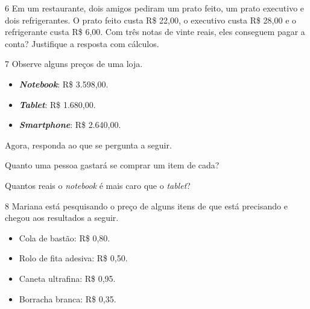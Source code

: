 \begin{mdframed}[linewidth=2pt,linecolor=salmao,roundcorner=2pt]
\num{6} Em um restaurante, dois amigos pediram um prato feito, um prato executivo
e dois refrigerantes. O prato feito custa R\$ 22,00, o executivo custa R\$
28,00 e o refrigerante custa R\$ 6,00. Com três notas de vinte reais, eles
conseguem pagar a conta? Justifique a resposta com cálculos.

\begin{mdframed}[linewidth=2pt,linecolor=salmao,roundcorner=2pt]

\end{mdframed}

\num{7} Observe alguns preços de uma loja.

\begin{mdframed}[linewidth=2pt,linecolor=azul!20,backgroundcolor=azul!20,roundcorner=2pt]
\begin{itemize}
  \item \textbf{\textit{Notebook}}: R\$ 3.598,00.
  \item \textbf{\textit{Tablet}}: R\$ 1.680,00.
  \item \textbf{\textit{Smartphone}}: R\$ 2.640,00.
\end{itemize}
\end{mdframed}

Agora, responda ao que se pergunta a seguir.

\begin{escolha}
\item
  Quanto uma pessoa gastará se comprar um item de cada?


\item
  Quantos reais o \textit{notebook} é mais caro que o \textit{tablet}?

\end{escolha}


\num{8} Mariana está pesquisando o preço de alguns itens de que está precisando e chegou aos resultados a seguir.

\begin{mdframed}[linewidth=2pt,linecolor=azul!20,backgroundcolor=azul!20,roundcorner=2pt]
\begin{itemize}
  \item Cola de bastão: R\$ 0,80.
  \item Rolo de fita adesiva: R\$ 0,50.
  \item Caneta ultrafina: R\$ 0,95.
  \item Borracha branca: R\$ 0,35.
\end{itemize}
\end{mdframed}


\end{mdframed}
